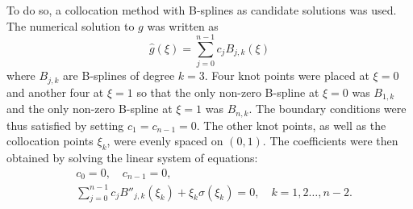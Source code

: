 \documentclass[twocolumn]{article}
\begin{document}
\begin{large}
To do so, a collocation method with B-splines as candidate solutions was used. The numerical solution to $g$ was written as 
\begin{equation}
    \hat{g}(\xi) = \sum_{j=0}^{n-1}c_jB_{j,k}(\xi)
\end{equation}
where $B_{j,k}$ are B-splines of degree $k=3$. Four knot points were placed at $\xi=0$ and another four at $\xi=1$ so that the only non-zero B-spline at $\xi=0$ was $B_{1,k}$ and the only non-zero B-spline at $\xi=1$ was $B_{n,k}$. The boundary conditions were thus satisfied by setting $c_1=c_{n-1}=0$. The other knot points, as well as the collocation points $\xi_k$, were evenly spaced on $(0,1)$. The coefficients were then obtained by solving the linear system of equations:
\begin{equation}
    \begin{split}
        &c_0 = 0, \quad c_{n-1} = 0, \\ 
        &\sum_{j=0}^{n-1}c_jB''_{j,k}(\xi_k) + \xi_k\sigma(\xi_k) = 0,\quad k=1,2\dots,n-2. \\ 
    \end{split}
\end{equation}


\end{large}
\end{document}
